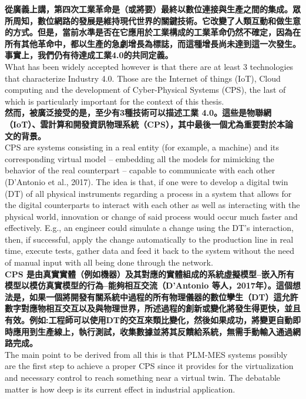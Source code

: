 \documentclass[24pt]{article} %
\begin{document}
\textbf{從廣義上講，第四次工業革命是（或將要）最終以數位連接與生產之間的集成。眾所周知，數位網路的發展是維持現代世界的關鍵技術。它改變了人類互動和做生意的方式。但是，當前水準是否在它應用於工業構成的工業革命仍然不確定，因為在所有其他革命中，都以生產的急劇增長為標誌，而這種增長尚未達到這一次發生。事實上，我們仍有待達成工業4.0的共同定義。}\\

What has been widely accepted however is that there are at least 3 technologies that characterize Industry 4.0. Those are the Internet of things (IoT), Cloud computing and the development of Cyber-Physical Systems (CPS), the last of which is particularly important for the context of this thesis.\\

\textbf{然而，被廣泛接受的是，至少有3種技術可以描述工業 4.0。這些是物聯網（IoT）、雲計算和開發資訊物理系統（CPS），其中最後一個尤為重要對於本論文的背景。}\\

CPS are systems consisting in a real entity (for example, a machine) and its corresponding virtual model – embedding all the models for mimicking the behavior of the real counterpart – capable to communicate with each other (D’Antonio et al., 2017). The idea is that, if one were to develop a digital twin (DT) of all physical instruments regarding a process in a system that allows for the digital counterparts to interact with each other as well as interacting with the physical world, innovation or change of said process would occur much faster and effectively. E.g., an engineer could simulate a change using the DT’s interaction, then, if successful, apply the change automatically to the production line in real time, execute tests, gather data and feed it back to the system without the need of manual input with all being done through the network.\\

\textbf{CPS 是由真實實體（例如機器）及其對應的實體組成的系統虛擬模型–嵌入所有模型以模仿真實模型的行為–能夠相互交流（D'Antonio 等人，2017年）。這個想法是，如果一個將開發有關系統中過程的所有物理儀器的數位孿生（DT）這允許數字對應物相互交互以及與物理世界，所述過程的創新或變化將發生得更快，並且有效。例如:工程師可以使用DT的交互來類比變化，然後如果成功，將變更自動即時應用到生產線上，執行測試，收集數據並將其反饋給系統，無需手動輸入通過網路完成。}\\

The main point to be derived from all this is that PLM-MES systems possibly are the first step to achieve a proper CPS since it provides for the virtualization and necessary control to reach something near a virtual twin. The debatable matter is how deep is its current effect in industrial application.\\
\end{document}
